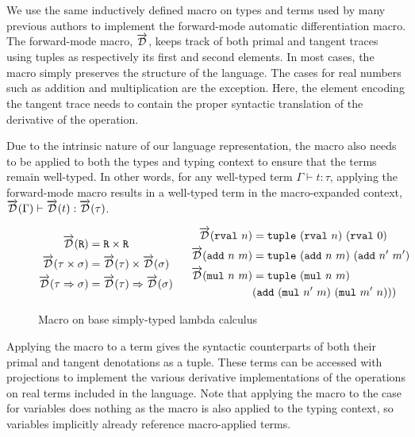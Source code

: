   We use the same inductively defined macro on types and terms used by many previous authors to implement the forward-mode automatic differentiation macro\cite{huot2020correctness}\cite{barthe2020versatility}\cite{Shaikha2019}.
  The forward-mode macro, $\overrightarrow{\mathcal{D}}$, keeps track of both primal and tangent traces using tuples as respectively its first and second elements.
  In most cases, the macro simply preserves the structure of the language.
  The cases for real numbers such as addition and multiplication are the exception.
  Here, the element encoding the tangent trace needs to contain the proper syntactic translation of the derivative of the operation.

  Due to the intrinsic nature of our language representation, the macro also needs to be applied to both the types and typing context to ensure that the terms remain well-typed.
  In other words, for any well-typed term $\Gamma \vdash t : \tau$, applying the forward-mode macro results in a well-typed term in the macro-expanded context, $\overrightarrow{\mathcal{D}}(\Gamma) \vdash \overrightarrow{\mathcal{D}}(t) : \overrightarrow{\mathcal{D}}(\tau)$.

  \begin{figure}[H]
    \centering
    \begin{equation*}
      \begin{split}
        \overrightarrow{\mathcal{D}}(\texttt{R}) &= \texttt{R} \times \texttt{R} \\
        \overrightarrow{\mathcal{D}}(\tau \times \sigma) &= \overrightarrow{\mathcal{D}}(\tau) \times \overrightarrow{\mathcal{D}}(\sigma) \\
        \overrightarrow{\mathcal{D}}(\tau \Rightarrow \sigma) &= \overrightarrow{\mathcal{D}}(\tau) \Rightarrow \overrightarrow{\mathcal{D}}(\sigma)
      \end{split}
      \;\;\;\;\;\;
      \begin{split}
        \overrightarrow{\mathcal{D}}(\texttt{rval}\ n) &= \texttt{tuple}\ (\texttt{rval}\ n)\ (\texttt{rval}\ 0) \\
        \overrightarrow{\mathcal{D}}(\texttt{add}\ n\ m) &= \texttt{tuple}\ (\texttt{add}\ n\ m)\ (\texttt{add}\ n'\ m') \\
        \overrightarrow{\mathcal{D}}(\texttt{mul}\ n\ m) &= \texttt{tuple}\ (\texttt{mul}\ n\ m)\ \\
          &{(\texttt{add}\ (\texttt{mul}\ n'\ m)\ (\texttt{mul}\ m'\ n))})
      \end{split}
    \end{equation*}
    \caption{Macro on base simply-typed lambda calculus}
    \label{eqn:macro_base}
  \end{figure}

  Applying the macro to a term gives the syntactic counterparts of both their primal and tangent denotations as a tuple.
  These terms can be accessed with projections to implement the various derivative implementations of the operations on real terms included in the language.
  Note that applying the macro to the case for variables does nothing as the macro is also applied to the typing context, so variables implicitly already reference macro-applied terms.

